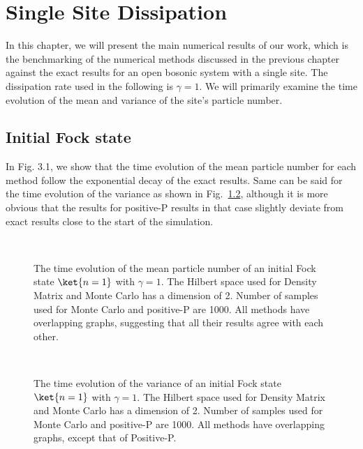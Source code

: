 \chapter{Single Site Dissipation}

In this chapter, we will present the main numerical results of our work, which is the benchmarking of the numerical methods discussed in the previous chapter against the exact results for an open bosonic system with a single site. The dissipation rate used in the following is $\gamma=1$. We will primarily examine the time evolution of the mean and variance of the site's particle number.


\section{Initial Fock state}
\hspace{\parindent} In Fig. 3.1, we show that the time evolution of the mean particle number for each method follow the exponential decay of the exact results. Same can be said for the time evolution of the variance as shown in Fig.~\ref{fig:fockVariance}, although it is more obvious that the results for positive-P results in that case slightly deviate from exact results close to the start of the simulation.

\begin{figure}[h]
  \centering
  \\
  \caption{
  The time evolution of the mean particle number of an initial Fock state $\ket{n=1}$ with $\gamma=1$. The Hilbert space used for Density Matrix and Monte Carlo has a dimension of 2. Number of samples used for Monte Carlo and positive-P are 1000. All methods have overlapping graphs, suggesting that all their results agree with each other.
  }\label{fig:fockMean}
\end{figure}
\begin{figure}[h]
  \centering
  \\
  \caption{
  The time evolution of the variance of an initial Fock state $\ket{n=1}$ with $\gamma=1$. The Hilbert space used for Density Matrix and Monte Carlo has a dimension of 2. Number of samples used for Monte Carlo and positive-P are 1000. All methods have overlapping graphs, except that of Positive-P.
  }\label{fig:fockVariance}
\end{figure}

